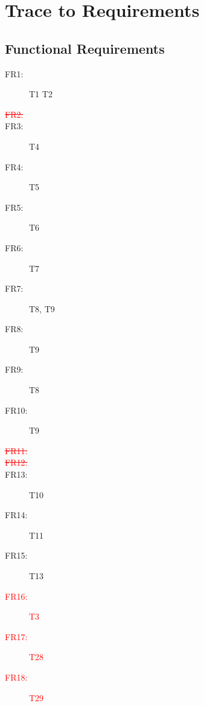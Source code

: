 \documentclass[12pt, titlepage]{article}
\begin{document}
\section{Trace to Requirements}

\subsection{Functional Requirements}

\begin{description}

    \item[FR1:] T1 T2

    \item[\textcolor{red}{\st{FR2:}}]

    \item[FR3:] T4

    \item[FR4:] T5

    \item[FR5:] T6

    \item[FR6:] T7

    \item[FR7:] T8, T9

    \item[FR8:] T9

    \item[FR9:] T8

    \item[FR10:] T9

    \item[\textcolor{red}{\st{FR11:}}]

    \item[\textcolor{red}{\st{FR12:}}]

    \item[FR13:] T10

    \item[FR14:] T11

    \item[FR15:] T13

    \item[\textcolor{red}{FR16:}] \textcolor{red}{T3}

    \item[\textcolor{red}{FR17:}] \textcolor{red}{T28}

    \item[\textcolor{red}{FR18:}] \textcolor{red}{T29}

\end{description}
\end{document}
